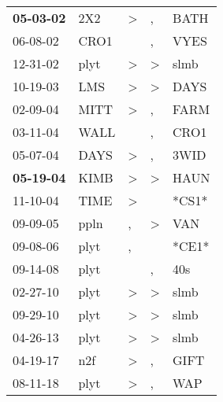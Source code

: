 \begin{supertabular}{p{0.07\textwidth}p{0.06\textwidth}p{0.02\textwidth}p{0.02\textwidth}p{0.06\textwidth}}
 \textbf{05-03-02\textsuperscript{}} &            2X2\textsuperscript{} &     \textgreater &                , &           BATH\textsuperscript{} \\
          06-08-02\textsuperscript{} &           CRO1\textsuperscript{} &                  &                , &           VYES\textsuperscript{} \\
          12-31-02\textsuperscript{} &           plyt\textsuperscript{} &     \textgreater &     \textgreater &           slmb\textsuperscript{} \\
          10-19-03\textsuperscript{} &            LMS\textsuperscript{} &     \textgreater &     \textgreater &           DAYS\textsuperscript{} \\
          02-09-04\textsuperscript{} &           MITT\textsuperscript{} &     \textgreater &                , &           FARM\textsuperscript{} \\
          03-11-04\textsuperscript{} &           WALL\textsuperscript{} &                  &                , &           CRO1\textsuperscript{} \\
          05-07-04\textsuperscript{} &           DAYS\textsuperscript{} &     \textgreater &                , &           3WID\textsuperscript{} \\
 \textbf{05-19-04\textsuperscript{}} &           KIMB\textsuperscript{} &     \textgreater &     \textgreater &           HAUN\textsuperscript{} \\
          11-10-04\textsuperscript{} &           TIME\textsuperscript{} &     \textgreater &                  &                            *CS1* \\
          09-09-05\textsuperscript{} &           ppln\textsuperscript{} &                , &     \textgreater &            VAN\textsuperscript{} \\
          09-08-06\textsuperscript{} &           plyt\textsuperscript{} &                , &                  &                            *CE1* \\
          09-14-08\textsuperscript{} &           plyt\textsuperscript{} &                  &                , &            40s\textsuperscript{} \\
          02-27-10\textsuperscript{} &           plyt\textsuperscript{} &     \textgreater &     \textgreater &           slmb\textsuperscript{} \\
          09-29-10\textsuperscript{} &           plyt\textsuperscript{} &     \textgreater &     \textgreater &           slmb\textsuperscript{} \\
          04-26-13\textsuperscript{} &           plyt\textsuperscript{} &     \textgreater &     \textgreater &           slmb\textsuperscript{} \\
          04-19-17\textsuperscript{} &            n2f\textsuperscript{} &     \textgreater &                , &           GIFT\textsuperscript{} \\
          08-11-18\textsuperscript{} &           plyt\textsuperscript{} &     \textgreater &                , &            WAP\textsuperscript{} \\
\end{supertabular}
